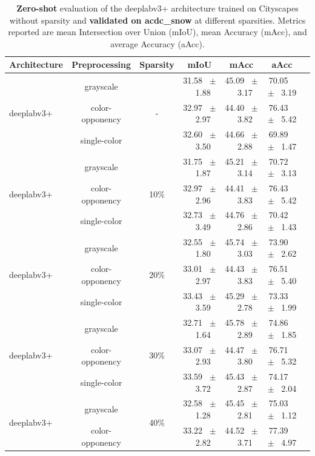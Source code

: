 \begin{table}[h]
  \centering
  \caption{\textbf{Zero-shot} evaluation of the deeplabv3+ architecture trained on Cityscapes without sparsity and \textbf{validated on acdc_snow} at different sparsities. Metrics reported are mean Intersection over Union (mIoU), mean Accuracy (mAcc), and average Accuracy (aAcc).}
  \begin{tabular}{@{}lccc ccc@{}}
    \toprule
    Architecture & Preprocessing & Sparsity & mIoU & mAcc & aAcc \\
    \midrule
    \multirow{3}{*}{deeplabv3+} & grayscale & \multirow{3}{*}{-} & 31.58 ~$\pm$~ 1.88 & 45.09 ~$\pm$~ 3.17 & 70.05 ~$\pm$~ 3.19 \\
    & color-opponency &  & 32.97 ~$\pm$~ 2.97 & 44.40 ~$\pm$~ 3.82 & 76.43 ~$\pm$~ 5.42 \\
    & single-color &  & 32.60 ~$\pm$~ 3.50 & 44.66 ~$\pm$~ 2.88 & 69.89 ~$\pm$~ 1.47 \\
    \midrule
    \multirow{3}{*}{deeplabv3+} & grayscale & \multirow{3}{*}{10\%} & 31.75 ~$\pm$~ 1.87 & 45.21 ~$\pm$~ 3.14 & 70.72 ~$\pm$~ 3.13 \\
    & color-opponency &  & 32.97 ~$\pm$~ 2.96 & 44.41 ~$\pm$~ 3.83 & 76.43 ~$\pm$~ 5.42 \\
    & single-color &  & 32.73 ~$\pm$~ 3.49 & 44.76 ~$\pm$~ 2.86 & 70.42 ~$\pm$~ 1.43 \\
    \midrule
    \multirow{3}{*}{deeplabv3+} & grayscale & \multirow{3}{*}{20\%} & 32.55 ~$\pm$~ 1.80 & 45.74 ~$\pm$~ 3.03 & 73.90 ~$\pm$~ 2.62 \\
    & color-opponency &  & 33.01 ~$\pm$~ 2.97 & 44.43 ~$\pm$~ 3.83 & 76.51 ~$\pm$~ 5.40 \\
    & single-color &  & 33.43 ~$\pm$~ 3.59 & 45.29 ~$\pm$~ 2.78 & 73.33 ~$\pm$~ 1.99 \\
    \midrule
    \multirow{3}{*}{deeplabv3+} & grayscale & \multirow{3}{*}{30\%} & 32.71 ~$\pm$~ 1.64 & 45.78 ~$\pm$~ 2.89 & 74.86 ~$\pm$~ 1.85 \\
    & color-opponency &  & 33.07 ~$\pm$~ 2.93 & 44.47 ~$\pm$~ 3.80 & 76.71 ~$\pm$~ 5.32 \\
    & single-color &  & 33.59 ~$\pm$~ 3.72 & 45.43 ~$\pm$~ 2.87 & 74.17 ~$\pm$~ 2.04 \\
    \midrule
    \multirow{3}{*}{deeplabv3+} & grayscale & \multirow{3}{*}{40\%} & 32.58 ~$\pm$~ 1.28 & 45.45 ~$\pm$~ 2.81 & 75.03 ~$\pm$~ 1.12 \\
    & color-opponency &  & 33.22 ~$\pm$~ 2.82 & 44.52 ~$\pm$~ 3.71 & 77.39 ~$\pm$~ 4.97 \\

\end{tabular}
\end{table}
